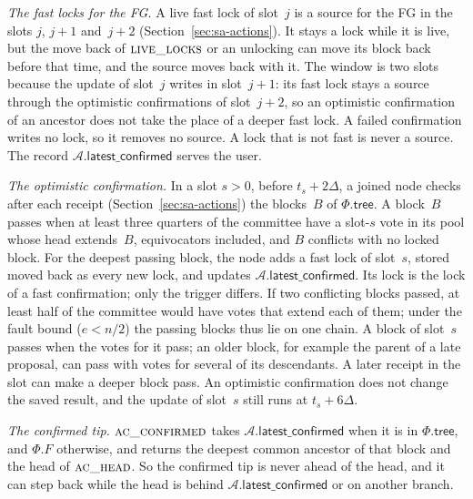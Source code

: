 \documentclass{article}
\newcommand{\AC}{\mathcal A}
\newcommand{\Fr}{\Phi}
\newcommand{\tree}{\mathsf{tree}}
\newcommand{\latestConfirmed}{\mathsf{latest\_confirmed}}
\begin{document}
\emph{The fast locks for the FG.}  A live fast lock of slot~$j$ is a
source for the FG in the slots $j$, $j+1$ and~$j+2$
(Section~\ref{sec:sa-actions}).  It stays a lock while it is live, but the
move back of $\Call{live\_locks}{}$ or an unlocking can move its block
back before that time, and the source moves back with it.  The window is two slots because the
update of slot~$j$ writes in slot~$j+1$: its fast lock stays a source
through the optimistic confirmations of slot~$j+2$, so an optimistic
confirmation of an ancestor does not take the place of a deeper fast
lock.  A failed confirmation writes no lock, so it removes no source.  A
lock that is not fast is never a source.  The record
$\AC.\latestConfirmed$ serves the user.

\emph{The optimistic confirmation.}  In a slot $s>0$, before
$t_s+2\Delta$, a joined node checks after each receipt
(Section~\ref{sec:sa-actions}) the blocks~$B$ of $\Fr.\tree$.  A
block~$B$ passes when at least three quarters of the committee have a
slot-$s$ vote in its pool whose head extends~$B$, equivocators included,
and $B$ conflicts with no locked block.  For the deepest passing block,
the node adds a fast lock of slot~$s$, stored moved back as every new
lock, and updates $\AC.\latestConfirmed$.
Its lock is the lock of a fast confirmation; only the trigger differs.  If two conflicting blocks passed,
at least half of the committee would have votes that extend each of them;
under the fault bound ($e<n/2$) the passing blocks thus lie on one chain.
A block of slot~$s$ passes when the votes for it pass; an older block, for
example the parent of a late proposal, can pass with votes for several of
its descendants.  A later receipt in the slot can make a deeper block
pass.  An optimistic confirmation does not change the saved result, and
the update of slot~$s$ still runs at $t_s+6\Delta$.

\emph{The confirmed tip.}  $\Call{ac\_confirmed}{}$ takes
$\AC.\latestConfirmed$ when it is in $\Fr.\tree$, and $\Fr.F$ otherwise, and returns the deepest common
ancestor of that block and the head of $\Call{ac\_head}{}$.  So the
confirmed tip is never ahead of the head, and it can step back while the
head is behind $\AC.\latestConfirmed$ or on another branch.
\end{document}
